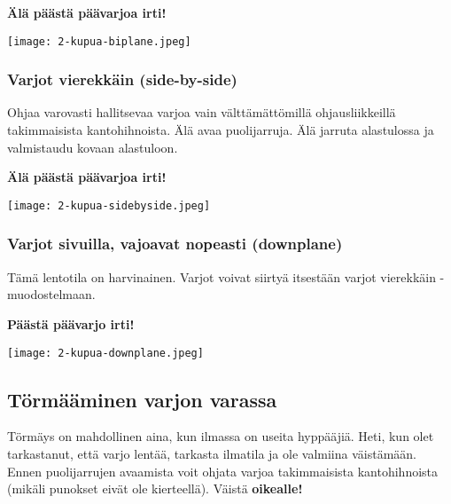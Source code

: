 \textbf{Älä päästä päävarjoa irti!} 


\begin{Figure}\centering\texttt{[image: 2-kupua-biplane.jpeg]}\end{Figure} 

\subsubsection{ Varjot vierekkäin (side-by-side) }
\label{mahdolliset-vaaratilanteet-varjot-vierekkain-side-by-side}


Ohjaa varovasti hallitsevaa varjoa vain välttämättömillä ohjausliikkeillä takimmaisista kantohihnoista. Älä avaa puolijarruja. Älä jarruta alastulossa ja valmistaudu kovaan alastuloon. 


\textbf{Älä päästä päävarjoa irti!}  


\begin{Figure}\centering\texttt{[image: 2-kupua-sidebyside.jpeg]}\end{Figure} 

\subsubsection{ Varjot sivuilla, vajoavat nopeasti (downplane) }
\label{mahdolliset-vaaratilanteet-varjot-sivuilla-vajoavat-nopeasti-downplane}


Tämä lentotila on harvinainen. Varjot voivat siirtyä itsestään varjot vierekkäin -muodostelmaan. 


\textbf{Päästä päävarjo irti!} 


\begin{Figure}\centering\texttt{[image: 2-kupua-downplane.jpeg]}\end{Figure} 

\subsection{ Törmääminen varjon varassa }
\label{mahdolliset-vaaratilanteet-tormaaminen-varjon-varassa}


Törmäys on mahdollinen aina, kun ilmassa on useita hyppääjiä. Heti, kun olet tarkastanut, että varjo lentää, tarkasta ilmatila ja ole valmiina väistämään. Ennen puolijarrujen avaamista voit ohjata varjoa takimmaisista kantohihnoista (mikäli punokset eivät ole kierteellä). Väistä \textbf{oikealle!} 


